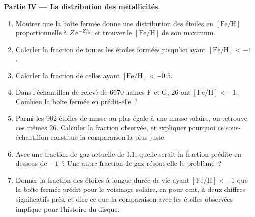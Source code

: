 \begin{problem}
\medskip\noindent\textbf{Partie IV --- La distribution des métallicités.}
\begin{enumerate}[resume]
\item Montrer que la boîte fermée donne une distribution des étoiles en
  $[\mathrm{Fe/H}]$ proportionnelle à $Z\,\mathrm{e}^{-Z/y}$, et trouver le
  $[\mathrm{Fe/H}]$ de son maximum.
\item Calculer la fraction de toutes les étoiles formées jusqu'ici ayant
  $[\mathrm{Fe/H}] < -1$.
\item Calculer la fraction de celles ayant $[\mathrm{Fe/H}] < -0.5$.
\item Dans l'échantillon de relevé de \num{6670} naines F et G, \num{26} ont
  $[\mathrm{Fe/H}] < -1$. Combien la boîte fermée en prédit-elle~?
\item Parmi les \num{902} étoiles de masse au plus égale à une masse solaire,
  on retrouve ces mêmes \num{26}. Calculer la fraction observée, et expliquer
  pourquoi ce sous-échantillon constitue la comparaison la plus juste.
\item Avec une fraction de gaz actuelle de $0.1$, quelle serait la fraction
  prédite en dessous de $-1$~? Une autre fraction de gaz résout-elle le
  problème~?
\item Donner la fraction des étoiles à longue durée de vie ayant
  $[\mathrm{Fe/H}] < -1$ que la boîte fermée prédit pour le voisinage solaire,
  en pour cent, à deux chiffres significatifs près, et dire ce que la
  comparaison avec les étoiles observées implique pour l'histoire du disque.
\end{enumerate}
\end{problem}
